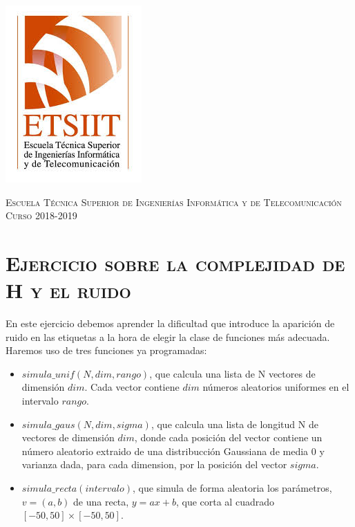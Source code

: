 \documentclass[11pt,a4paper]{article}
\begin{document}
\begin{titlepage}
\begin{minipage}{\textwidth}
\includegraphics[scale=0.3]{img/etsiit.jpeg}

\vspace{0.7cm}
\textsc{Escuela Técnica Superior de Ingenierías Informática y de Telecomunicación}\\
\vspace{1cm}
\textsc{Curso 2018-2019}
\end{minipage}
\end{titlepage}

\tableofcontents
\thispagestyle{empty}				%

\newpage

\setlength{\parskip}{1em}

\section{\textsc{Ejercicio sobre la complejidad de H y el ruido}}
\noindent En este ejercicio debemos aprender la dificultad que introduce la aparición de ruido en las
etiquetas a la hora de elegir la clase de funciones más adecuada. Haremos uso de tres funciones
ya programadas:

\begin{itemize}
	\item $simula\_unif(N, dim, rango)$, que calcula una lista de N vectores de dimensión $dim$.
	Cada vector contiene $dim$ números aleatorios uniformes en el intervalo $rango$.
	\item $simula\_gaus(N, dim, sigma)$, que calcula una lista de longitud N de vectores de
	dimensión $dim$, donde cada posición del vector contiene un número aleatorio extraido de una
	distribucción Gaussiana de media 0 y varianza dada, para cada dimension, por la posición
	del vector $sigma$.
	\item $simula\_recta(intervalo)$, que simula de forma aleatoria los parámetros, $v = (a, b)$
	de una recta, $y = ax + b$, que corta al cuadrado $[-50, 50] \times [-50, 50]$.
\end{itemize}
\end{document}
